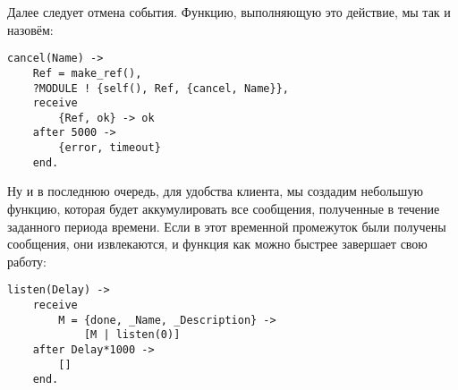 Далее следует отмена события.
Функцию, выполняющую это действие, мы так и назовём:
\begin{lstlisting}[style=erlang]
cancel(Name) ->
    Ref = make_ref(),
    ?MODULE ! {self(), Ref, {cancel, Name}},
    receive
        {Ref, ok} -> ok
    after 5000 ->
        {error, timeout}
    end.
\end{lstlisting}

Ну и в последнюю очередь, для удобства клиента, мы создадим небольшую функцию, которая будет аккумулировать все сообщения, полученные в течение заданного периода времени.
Если в этот временной промежуток были получены сообщения, они извлекаются, и функция как можно быстрее завершает свою работу:
\begin{lstlisting}[style=erlang]
listen(Delay) ->
    receive
        M = {done, _Name, _Description} ->
            [M | listen(0)]
    after Delay*1000 ->
        []
    end.
\end{lstlisting}
